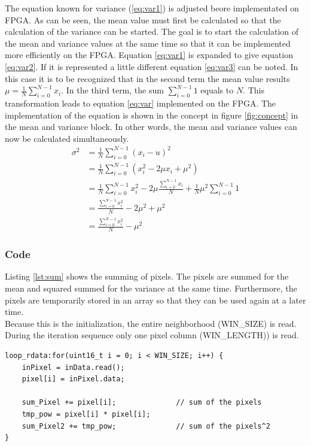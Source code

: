 The equation known for variance (\ref{eq:var1}) is adjusted beore implementated
on FPGA.
As can be seen, the mean value must first be calculated so that the calculation of the
variance can be started. The goal is to start the calculation of the mean
and variance values at the same time so that it can be implemented more
efficiently on the FPGA.
Equation \ref{eq:var1} is expanded to give equation \ref{eq:var2}. If
it is represented a little different equation 
\ref{eq:var3} can be noted. In this case it is to be recognized that in the second term the
mean value results $\mu = \frac{1}{N} \sum_{i = 0}^{N - 1} x_{i}$. In the third term,
the sum $\sum_{i = 0}^{N - 1} 1$ equals to $N$.
This transformation leads to equation \ref{eq:var} implemented on the FPGA. The
implementation of the equation is shown in the concept in figure \ref{fig:concept} in the mean and variance block. In other words, the mean and variance values can now be calculated simultaneously.
\begin{align}
    \sigma^{2} & = \frac{1}{N} \sum_{i = 0}^{N - 1} (x_{i} - u)^{2} \label{eq:var1}\\ 
    		& = \frac{1}{N} \sum_{i = 0}^{N - 1} (x_{i}^{2} - 2 \mu x_{i} + \mu^{2})  \label{eq:var2}\\
    		& = \frac{1}{N} \sum_{i = 0}^{N - 1} x_{i}^{2} - 2\mu \frac{\sum_{i = 0}^{N - 1} x_{i}}{N} + \frac{1}{N} \mu^{2} \sum_{i = 0}^{N - 1} 1 \label{eq:var3}\\
    		& = \frac{\sum_{i = 0}^{N - 1} x_{i}^{2}}{N}  - 2\mu^{2} + \mu^{2} \label{eq:var4}\\
    		& = \frac{\sum_{i = 0}^{N - 1} x_{i}^{2}}{N}  - \mu^{2}
    \label{eq:var}
\end{align}

\subsubsection*{Code}
Listing \ref{lst:sum} shows the summing of pixels. The pixels are summed for the mean and squared summed for the variance at the same time. Furthermore, the pixels are temporarily stored in an array so that they can be used again at a later time. \\
Because this is the initialization, the entire neighborhood (WIN\_SIZE) is read. During the iteration sequence only one pixel column (WIN\_LENGTH)) is read. \\
\begin{minipage}{\textwidth}
\begin{lstlisting}[style=CStyle, caption=Calculation of the sum, label=lst:sum]
loop_rdata:for(uint16_t i = 0; i < WIN_SIZE; i++) {
	inPixel = inData.read();
	pixel[i] = inPixel.data;

	sum_Pixel += pixel[i];				// sum of the pixels
	tmp_pow = pixel[i] * pixel[i];
	sum_Pixel2 += tmp_pow;				// sum of the pixels^2
}
\end{lstlisting}
\end{minipage}

